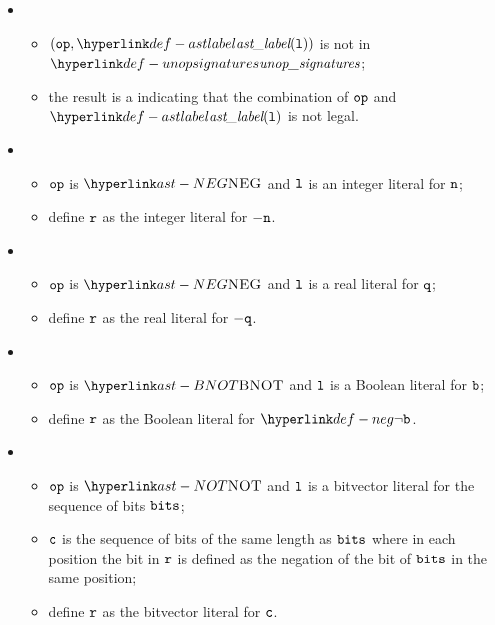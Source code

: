 \ProseParagraph
\OneApplies
\begin{itemize}
  \item {}
  \begin{itemize}
    \item $(\op, \astlabel(\vl))$ is not in $\unopsignatures$;
    \item the result is a \typingerrorterm{} indicating that the combination of $\texttt{op}$ and $\astlabel(\vl)$
          is not legal.
  \end{itemize}

  \item {}
  \begin{itemize}
    \item $\texttt{op}$ is $\NEG$ and $\texttt{l}$ is an integer literal for $\texttt{n}$;
    \item define $\texttt{r}$ as the integer literal for $- \texttt{n}$.
  \end{itemize}

  \item {}
  \begin{itemize}
    \item $\texttt{op}$ is $\NEG$ and $\texttt{l}$ is a real literal for $\texttt{q}$;
    \item define $\texttt{r}$ as the real literal for $- \texttt{q}$.
  \end{itemize}

  \item {}
  \begin{itemize}
    \item $\texttt{op}$ is $\BNOT$ and $\texttt{l}$ is a Boolean literal for $\texttt{b}$;
    \item define $\texttt{r}$ as the Boolean literal for $\neg\vb$.
  \end{itemize}

  \item {}
  \begin{itemize}
    \item $\texttt{op}$ is $\NOT$ and $\texttt{l}$ is a bitvector literal for the sequence of bits $\texttt{bits}$;
    \item $\texttt{c}$ is the sequence of bits of the same length as $\texttt{bits}$ where in each position
          the bit in $\texttt{r}$ is defined as the negation of the bit of $\texttt{bits}$ in the same position;
    \item define $\texttt{r}$ as the bitvector literal for $\texttt{c}$.
  \end{itemize}
\end{itemize}

